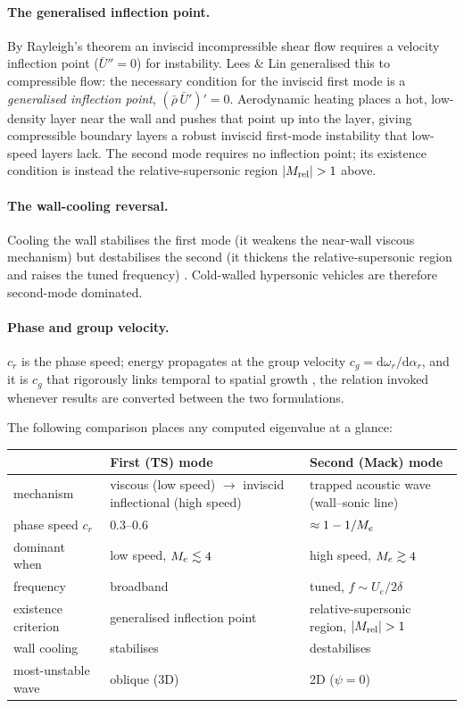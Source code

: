 \documentclass[11pt]{article}
\begin{document}
\paragraph{The generalised inflection point.} By Rayleigh's theorem an inviscid incompressible shear
flow requires a velocity inflection point ($\bar U''=0$) for instability. Lees \& Lin
\cite{leeslin1946} generalised this to compressible flow: the necessary condition for the inviscid
first mode is a \emph{generalised inflection point}, $(\bar\rho\,\bar U')'=0$. Aerodynamic heating
places a hot, low-density layer near the wall and pushes that point up into the layer, giving
compressible boundary layers a robust inviscid first-mode instability that low-speed layers lack. The
second mode requires no inflection point; its existence condition is instead the relative-supersonic
region $|M_{\rm rel}|>1$ above.

\paragraph{The wall-cooling reversal.} Cooling the wall stabilises the first mode (it weakens the
near-wall viscous mechanism) but destabilises the second (it thickens the relative-supersonic region
and raises the tuned frequency) \cite{mack1984}. Cold-walled hypersonic vehicles are therefore
second-mode dominated.

\paragraph{Phase and group velocity.} $c_r$ is the phase speed; energy propagates at the group
velocity $c_g=\mathrm d\omega_r/\mathrm d\alpha_r$, and it is $c_g$ that rigorously links temporal to
spatial growth \cite{gaster1962}, the relation invoked whenever results are converted between the two
formulations.

\medskip
\noindent The following comparison places any computed eigenvalue at a glance:
\begin{center}\small
\renewcommand{\arraystretch}{1.2}
\begin{tabular}{@{}>{\raggedright\arraybackslash}p{3.1cm}>{\raggedright\arraybackslash}p{5.1cm}>{\raggedright\arraybackslash}p{5.1cm}@{}}
\toprule
 & \textbf{First (TS) mode} & \textbf{Second (Mack) mode} \\
\midrule
mechanism & viscous (low speed) $\to$ inviscid inflectional (high speed) & trapped acoustic wave (wall--sonic line) \\
phase speed $c_r$ & $0.3$--$0.6$ & $\approx 1-1/M_e$ \\
dominant when & low speed, $M_e\lesssim4$ & high speed, $M_e\gtrsim4$ \\
frequency & broadband & tuned, $f\sim U_e/2\delta$ \\
existence criterion & generalised inflection point \cite{leeslin1946} & relative-supersonic region, $|M_{\rm rel}|>1$ \\
wall cooling & stabilises & destabilises \\
most-unstable wave & oblique (3D) & 2D ($\psi=0$) \\
\bottomrule
\end{tabular}
\end{center}
\end{document}
